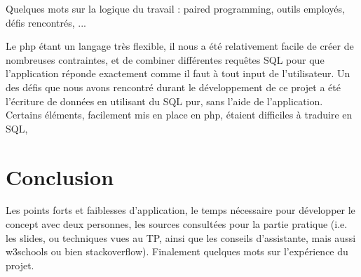 \documentclass[a4paper,12pt]{article}
\begin{document}
Quelques mots sur la logique du travail : paired programming, outils employés, défis rencontrés, ...

Le php étant un langage très flexible, il nous a été relativement facile de créer de nombreuses contraintes, et de combiner différentes requêtes SQL pour que l'application réponde exactement comme il faut à tout input de l'utilisateur. 
Un des défis que nous avons rencontré durant le développement de ce projet a été l'écriture de données en utilisant du SQL pur, sans l'aide de l'application. Certains éléments, facilement mis en place en php, étaient difficiles à traduire en SQL,

\newpage
\section{Conclusion}

Les points forts et faiblesses d’application, le temps nécessaire pour développer le concept avec deux personnes, les sources consultées pour la partie pratique (i.e. les slides, ou techniques vues au TP, ainsi que les conseils d’assistante, mais aussi w3schools ou bien stackoverflow).
Finalement quelques mots sur l'expérience du projet.




\newpage

%
%

\end{document}
